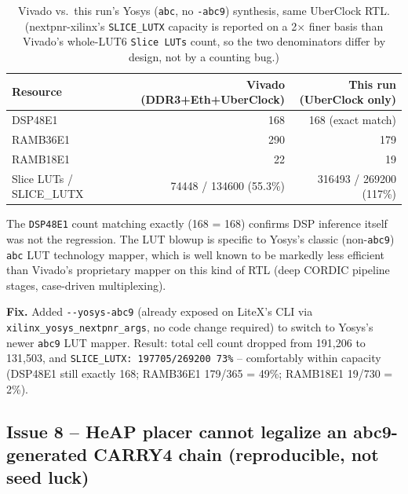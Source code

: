 \documentclass[11pt]{article}
\begin{document}
\begin{table}[H]
\centering
\begin{tabular}{lrr}
\toprule
Resource & Vivado (DDR3+Eth+UberClock) & This run (UberClock only) \\
\midrule
DSP48E1   & 168            & 168 (exact match) \\
RAMB36E1  & 290            & 179 \\
RAMB18E1  & 22             & 19 \\
Slice LUTs / SLICE\_LUTX & 74448 / 134600 (55.3\%) & 316493 / 269200 (117\%) \\
\bottomrule
\end{tabular}
\caption{Vivado vs.\ this run's Yosys (\texttt{abc}, no \texttt{-abc9}) synthesis,
same UberClock RTL. (nextpnr-xilinx's \texttt{SLICE\_LUTX} capacity is reported
on a 2$\times$ finer basis than Vivado's whole-LUT6 \texttt{Slice LUTs} count, so
the two denominators differ by design, not by a counting bug.)}
\end{table}

The \lstinline{DSP48E1} count matching exactly (168 = 168) confirms DSP
inference itself was not the regression. The LUT blowup is specific to
Yosys's classic (non-\lstinline{abc9}) \lstinline{abc} LUT technology
mapper, which is well known to be markedly less efficient than Vivado's
proprietary mapper on this kind of RTL (deep CORDIC pipeline stages,
case-driven multiplexing).

\textbf{Fix.} Added \lstinline{--yosys-abc9} (already exposed on LiteX's
CLI via \lstinline{xilinx_yosys_nextpnr_args}, no code change required) to
switch to Yosys's newer \lstinline{abc9} LUT mapper. Result: total cell
count dropped from 191{,}206 to 131{,}503, and
\lstinline{SLICE_LUTX: 197705/269200 73%} -- comfortably within capacity
(DSP48E1 still exactly 168; RAMB36E1 179/365 = 49\%; RAMB18E1 19/730 =
2\%).

\subsection{Issue 8 -- HeAP placer cannot legalize an abc9-generated
CARRY4 chain (reproducible, not seed luck)}
\label{sec:issue8}
\end{document}
